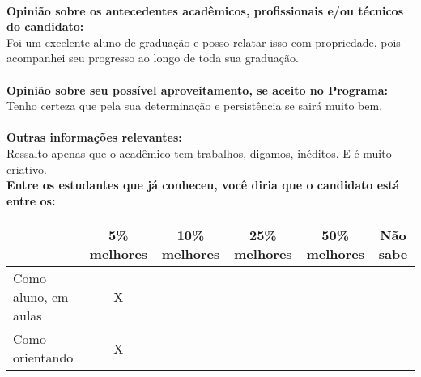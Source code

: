 \documentclass[11pt]{article}
\begin{document}
\\
\textbf{Opinião sobre os antecedentes acadêmicos, profissionais e/ou técnicos do candidato:}
\\Foi um excelente aluno de graduação e posso relatar isso com propriedade, pois acompanhei seu progresso ao longo de toda sua graduação. \\
\\
\textbf{Opinião sobre seu possível aproveitamento, se aceito no Programa:}
\\Tenho certeza que pela sua determinação e persistência se sairá muito bem.\\ 
\\
\textbf{Outras informações relevantes:} \\Ressalto apenas que o acadêmico tem trabalhos, digamos, inéditos. E é muito criativo.
\\[0.3cm]
\textbf{Entre os estudantes que já conheceu, você diria que o candidato está entre os:}
\\
\begin{tabular}{|l|c|c|c|c|c|}
\hline
 & 5\% melhores & 10\% melhores & 25\% melhores & 50\% melhores & Não sabe \\
\hline
Como aluno, em aulas & X &  &  &  & \\
\hline
Como orientando & X &  &  &  & \\
\hline
\end{tabular}
\end{document}
